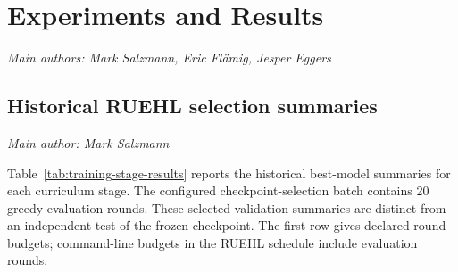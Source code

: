 \documentclass[11pt,a4paper]{article}
\newcommand{\contributionauthor}[1]{{\small\textit{Main author: #1}\par}}
\newcommand{\contributionauthors}[1]{{\small\textit{Main authors: #1}\par}}
\begin{document}
\FloatBarrier
\begingroup\let\section\subsection\let\subsection\subsubsection
\endgroup
\section{Experiments and Results}\label{sec:results}
\contributionauthors{Mark Salzmann, Eric Flämig, Jesper Eggers}


\subsection{Historical RUEHL selection summaries}
\contributionauthor{Mark Salzmann}
Table~\ref{tab:training-stage-results} reports the historical best-model summaries for each curriculum stage. The configured checkpoint-selection batch contains 20 greedy evaluation rounds. These selected validation summaries are distinct from an independent test of the frozen checkpoint. The first row gives declared round budgets; command-line budgets in the RUEHL schedule include evaluation rounds.
\end{document}
